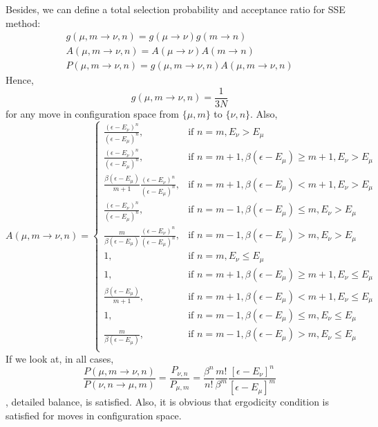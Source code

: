 \documentclass[12pt,fleqn]{report}
\begin{document}
Besides, we can define a total selection probability and acceptance ratio for 
SSE method:
\begin{gather}
g(\mu,m \rightarrow \nu,n) = g(\mu \rightarrow \nu) g(m \rightarrow n) 
\\
A(\mu,m \rightarrow \nu,n) = A(\mu \rightarrow \nu) A(m \rightarrow n)
\\
P(\mu,m \rightarrow \nu,n) = g(\mu,m \rightarrow \nu,n) A(\mu,m 
\rightarrow \nu,n)
\end{gather}
Hence, 
\begin{equation}
g(\mu,m \rightarrow \nu,n) = \frac{1}{3N}
\end{equation}
for any move in configuration space from $\{\mu, m\}$ to $\{\nu, n\}$.
Also,
\[
    A(\mu, m \rightarrow \nu, n)= 
\begin{cases}
   \frac{(\epsilon - E_\nu)^n}{(\epsilon - E_\mu)^n} ,& \text{if } n=m, E_\nu 
   > 
   E_\mu\\
    \frac{(\epsilon - E_\nu)^n}{(\epsilon - E_\mu)^n},              & \text{if } 
    n=m+1 , 
    \beta (\epsilon - E_\mu) \geq m+1, E_\nu > E_\mu\\
    \frac{\beta (\epsilon - E_\mu)}{m+1 }\frac{(\epsilon - E_\nu)^n}
    {(\epsilon - 
    E_\mu)^n},  & \text{if } n = m+1 ,  \beta 
    (\epsilon - E_\mu) < m+1, E_\nu > E_\mu \\
    \frac{(\epsilon - E_\nu)^n}{(\epsilon - E_\mu)^n}, & \text{if } n = m-1 ,  
    \beta 
    (\epsilon - E_\mu) \leq m, E_\nu > E_\mu \\
    \frac{m}{\beta (\epsilon - E_\mu)} \frac{(\epsilon - E_\nu)^n}{(\epsilon - 
    E_\mu)^n}, & \text{if } n = m-1 ,  \beta (\epsilon 
    - E_\mu) > m, E_\nu > E_\mu \\
       1 ,& \text{if } n=m, E_\nu \leq E_\mu\\
    1,              & \text{if } n=m+1 , \beta (\epsilon - E_\mu) \geq m+1, 
    E_\nu \leq E_\mu\\
    \frac{\beta (\epsilon - E_\mu)}{m+1},  & \text{if } n = m+1 ,  \beta 
    (\epsilon - E_\mu) < m+1, E_\nu \leq E_\mu \\
    1, & \text{if } n = m-1 ,  \beta (\epsilon - E_\mu) \leq m, E_\nu \leq 
    E_\mu \\
    \frac{m}{\beta (\epsilon - E_\mu)}, & \text{if } n = m-1 ,  \beta (\epsilon 
    - E_\mu) > m, E_\nu \leq E_\mu \\
    

\end{cases}
\]
If we look at, in all cases,
\begin{equation}
\frac{P(\mu,m \rightarrow \nu,n)}{P(\nu,n \rightarrow \mu,m)} = 
\frac{P_{\nu,n} 
}{P_{\mu,m} } = \frac{\beta^n}{n!}\frac{m!}{\beta^m}\frac{[\epsilon - 
E_\nu]^n}{[\epsilon - E_\mu]^m}
\end{equation}
, detailed balance, is satisfied.
Also, it is obvious that ergodicity condition is satisfied for moves in 
configuration space.
\end{document}
